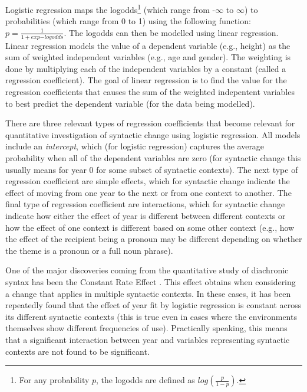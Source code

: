 	Logistic regression maps the logodds\footnote{For any probability $p$, the logodds are defined as $log(\frac{p}{1-p})$.} (which range from -$\infty$ to $\infty$) to probabilities (which range from 0 to 1) using the following function: $p=\frac{1}{1+exp{-logodds}}$. The logodds can then be modelled using linear regression. Linear regression models the value of a dependent variable (e.g., height) as the sum of weighted independent variables (e.g., age and gender). The weighting is done by multiplying each of the independent variables by a constant (called a regression coefficient). The goal of linear regression is to find the value for the regression coefficients that causes the sum of the weighted indepentent variables to best predict the dependent variable (for the data being modelled).

	There are three relevant types of regression coefficients that become relevant for quantitative investigation of syntactic change using logistic regression. All models include an \textit{intercept}, which (for logistic regression) captures the average probability when all of the dependent variables are zero (for syntactic change this usually means for year 0 for some subset of syntactic contexts). The next type of regression coefficient are simple effects, which for syntactic change indicate the effect of moving from one year to the next or from one context to another. The final type of regression coefficient are interactions, which for syntactic change indicate how either the effect of year is different between different contexts or how the effect of one context is different based on some other context (e.g., how the effect of the recipient being a pronoun may be different depending on whether the theme is a pronoun or a full noun phrase).

	One of the major discoveries coming from the quantitative study of diachronic syntax has been the Constant Rate Effect \citep{Kroch.1989,Kroch.1994}. This effect obtains when considering a change that applies in multiple syntactic contexts. In these cases, it has been repeatedly found that the effect of year fit by logistic regression is constant across its different syntactic contexts (this is true even in cases where the environments themselves show different frequencies of use). Practically speaking, this means that a significant interaction between year and variables representing syntactic contexts are not found to be significant.

